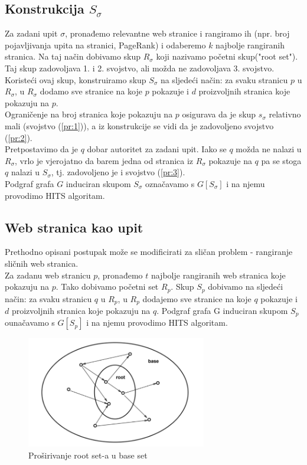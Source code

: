 \documentclass[11pt]{article}
\begin{document}
\subsection{Konstrukcija $S_{\sigma}$}\label{sec:1}
Za zadani upit $\sigma$, pronađemo relevantne web stranice i rangiramo ih (npr. broj pojavljivanja upita na stranici, PageRank) i odaberemo $k$ najbolje rangiranih stranica. Na taj način dobivamo skup $R_{\sigma}$ koji nazivamo početni skup("root set"). Taj skup zadovoljava 1. i 2. svojstvo, ali možda ne zadovoljava 3. svojstvo. Koristeći ovaj skup, konstruiramo skup $S_{\sigma}$ na sljedeći način: za svaku stranicu $p$ u $R_{\sigma}$, u $R_{\sigma}$ dodamo sve stranice na koje $p$ pokazuje i $d$ proizvoljnih stranica koje pokazuju na $p$.\\
Ograničenje na broj stranica koje pokazuju na $p$ osigurava da je skup $s_{\sigma}$ relativno mali (svojstvo (\ref{pr:1})), a iz konstrukcije se vidi da je zadovoljeno svojstvo (\ref{pr:2}). \\
Pretpostavimo da je $q$ dobar autoritet za zadani upit. Iako se $q$ možda  ne nalazi u $R_{\sigma}$, vrlo je vjerojatno da barem jedna od stranica iz $R_{\sigma}$ pokazuje na $q$ pa se stoga $q$ nalazi u $S_{\sigma}$, tj. zadovoljeno je i svojstvo (\ref{pr:3}).\\
Podgraf grafa $G$ induciran skupom $S_{\sigma}$ označavamo s $G[S_{\sigma}]$ i na njemu provodimo HITS algoritam.

\newpage
\subsection{Web stranica kao upit} \label{sec:2}
Prethodno opisani postupak može se modificirati za sličan problem - rangiranje sličnih web stranica. \\
Za zadanu web stranicu $p$, pronađemo $t$ najbolje rangiranih web stranica koje pokazuju na $p$. Tako dobivamo početni set $R_{p}$. Skup $S_{p}$ dobivamo na sljedeći način: za svaku stranicu $q$ u $R_{p}$, u $R_{p}$ dodajemo sve stranice na koje $q$ pokazuje i $d$ proizvoljnih stranica koje pokazuju na $q$. Podgraf grafa G induciran skupom $S_{p}$ ounačavamo s $G[S_{p}]$ i na njemu provodimo HITS algoritam.

\begin{figure}[hb!]
\centering
\includegraphics[width=0.7\textwidth]{root.png}  
\caption{Proširivanje root set-a u base set}
\end{figure}
\end{document}
